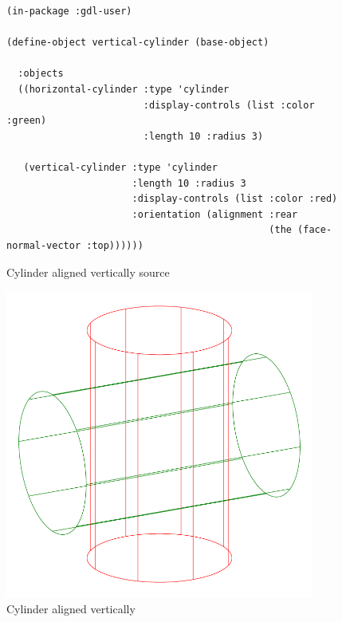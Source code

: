 \documentclass [11pt]{book}
\begin{document}
\begin{figure}\begin{lrbox}{\boxedverb}
\begin{minipage}{\linewidth}\begin{verbatim}(in-package :gdl-user)

(define-object vertical-cylinder (base-object)

  :objects
  ((horizontal-cylinder :type 'cylinder
                        :display-controls (list :color :green)
                        :length 10 :radius 3)

   (vertical-cylinder :type 'cylinder
                      :length 10 :radius 3
                      :display-controls (list :color :red)
                      :orientation (alignment :rear 
                                              (the (face-normal-vector :top))))))

\end{verbatim}\end{minipage}
\end{lrbox}
\fbox{\usebox{\boxedverb}}

\caption{Cylinder aligned vertically source}

\label{fig:vertical-cylinder-source}

\end{figure}

\begin{figure}
\begin{center}
\includegraphics[width=4in,height=4in]{../images/vertical-cylinder.pdf}
\end{center}

\caption{Cylinder aligned vertically}

\label{fig:vertical-cylinder}

\end{figure}
\end{document}
